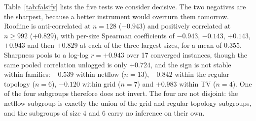 Table~\ref{tab:falsify} lists the five tests we consider decisive. The two
negatives are the sharpest, because a better instrument would overturn them
tomorrow. Roofline is anti-correlated at $n{=}128$ ($-0.943$) and positively
correlated at $n \geq 992$ ($+0.829$), with per-size Spearman coefficients of
$-0.943$, $-0.143$, $+0.143$, $+0.943$ and then $+0.829$ at each of the three
largest sizes, for a mean of $0.355$. Sharpness pools to a log-log
$r = +0.943$ over 17 converged instances, though the same pooled correlation
unlogged is only $+0.724$, and the sign is not stable within families:
$-0.539$ within netflow ($n=13$), $-0.842$ within the regular topology
($n=6$), $-0.120$ within grid ($n=7$) and $+0.983$ within TV ($n=4$). One of
the four subgroups therefore does not invert. The four are not disjoint: the
netflow subgroup is exactly the union of the grid and regular topology
subgroups, and the subgroups of size 4 and 6 carry no inference on their own.

